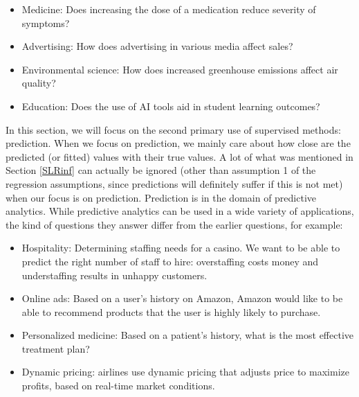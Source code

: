 \documentclass[
]{book}
\providecommand{\tightlist}{%
  \setlength{\itemsep}{0pt}\setlength{\parskip}{0pt}}
\begin{document}
\begin{itemize}
\tightlist
\item
  Medicine: Does increasing the dose of a medication reduce severity of symptoms?
\item
  Advertising: How does advertising in various media affect sales?
\item
  Environmental science: How does increased greenhouse emissions affect air quality?
\item
  Education: Does the use of AI tools aid in student learning outcomes?
\end{itemize}

In this section, we will focus on the second primary use of supervised methods: prediction. When we focus on prediction, we mainly care about how close are the predicted (or fitted) values with their true values. A lot of what was mentioned in Section \ref{SLRinf} can actually be ignored (other than assumption 1 of the regression assumptions, since predictions will definitely suffer if this is not met) when our focus is on prediction. Prediction is in the domain of predictive analytics. While predictive analytics can be used in a wide variety of applications, the kind of questions they answer differ from the earlier questions, for example:

\begin{itemize}
\tightlist
\item
  Hospitality: Determining staffing needs for a casino. We want to be able to predict the right number of staff to hire: overstaffing costs money and understaffing results in unhappy customers.
\item
  Online ads: Based on a user's history on Amazon, Amazon would like to be able to recommend products that the user is highly likely to purchase.
\item
  Personalized medicine: Based on a patient's history, what is the most effective treatment plan?
\item
  Dynamic pricing: airlines use dynamic pricing that adjusts price to maximize profits, based on real-time market conditions.
\end{itemize}

  
\end{document}
